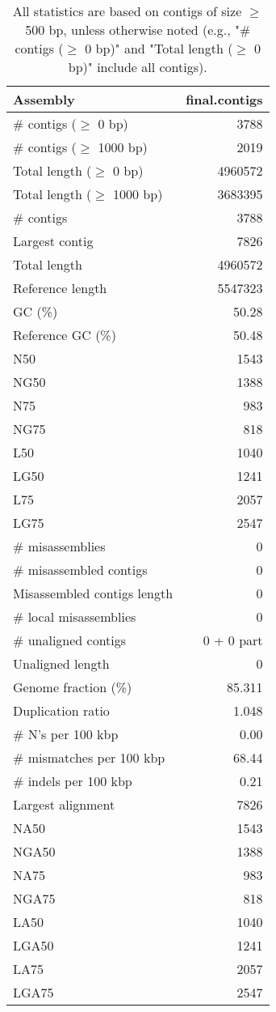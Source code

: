 \documentclass[12pt,a4paper]{article}
\begin{document}
\begin{table}[ht]
\begin{center}
\caption{All statistics are based on contigs of size $\geq$ 500 bp, unless otherwise noted (e.g., "\# contigs ($\geq$ 0 bp)" and "Total length ($\geq$ 0 bp)" include all contigs).}
\begin{tabular}{|l*{1}{|r}|}
\hline
Assembly & final.contigs \\ \hline
\# contigs ($\geq$ 0 bp) & 3788 \\ \hline
\# contigs ($\geq$ 1000 bp) & 2019 \\ \hline
Total length ($\geq$ 0 bp) & 4960572 \\ \hline
Total length ($\geq$ 1000 bp) & 3683395 \\ \hline
\# contigs & 3788 \\ \hline
Largest contig & 7826 \\ \hline
Total length & 4960572 \\ \hline
Reference length & 5547323 \\ \hline
GC (\%) & 50.28 \\ \hline
Reference GC (\%) & 50.48 \\ \hline
N50 & 1543 \\ \hline
NG50 & 1388 \\ \hline
N75 & 983 \\ \hline
NG75 & 818 \\ \hline
L50 & 1040 \\ \hline
LG50 & 1241 \\ \hline
L75 & 2057 \\ \hline
LG75 & 2547 \\ \hline
\# misassemblies & 0 \\ \hline
\# misassembled contigs & 0 \\ \hline
Misassembled contigs length & 0 \\ \hline
\# local misassemblies & 0 \\ \hline
\# unaligned contigs & 0 + 0 part \\ \hline
Unaligned length & 0 \\ \hline
Genome fraction (\%) & 85.311 \\ \hline
Duplication ratio & 1.048 \\ \hline
\# N's per 100 kbp & 0.00 \\ \hline
\# mismatches per 100 kbp & 68.44 \\ \hline
\# indels per 100 kbp & 0.21 \\ \hline
Largest alignment & 7826 \\ \hline
NA50 & 1543 \\ \hline
NGA50 & 1388 \\ \hline
NA75 & 983 \\ \hline
NGA75 & 818 \\ \hline
LA50 & 1040 \\ \hline
LGA50 & 1241 \\ \hline
LA75 & 2057 \\ \hline
LGA75 & 2547 \\ \hline
\end{tabular}
\end{center}
\end{table}
\end{document}
